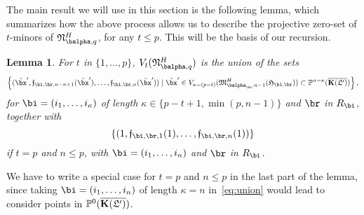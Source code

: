 \documentclass[12pt]{article}
\newtheorem{lemma}[definition]{Lemma}
\begin{document}
The main result we will use in this section is the following lemma,
which summarizes how the above process allows us to describe the
projective zero-set of $t$-minors of $\mathfrak{N}^H_{\balpha,q}$, for
any $t \le p$. This will be the basis of our recursion.
\begin{lemma}\label{lemma:union}
  For $t$ in $\{1,\dots,p\}$, $V_t(\mathfrak{N}^H_{\balpha,q})$ is the
  union of the sets
 \begin{align}\label{eq:union}
 \left \{(\tilde\bx',\mathfrak{f}_{\bi,\br,n-\kappa+1}(\tilde\bx'),\dots,\mathfrak{f}_{\bi,\br,n}(\tilde\bx')) \mid \tilde\bx' \in
  V_{\kappa-(p-t)}(\mathfrak{M}^H_{\balpha_\bi,n-1}(\mathfrak{H}_{\bi,\br})) \subset \P^{n-\kappa}(\KKGpbar)\right \},   
 \end{align}
 for $\bi=(i_1,\dots,i_\kappa)$ of length $\kappa \in \{p-t+1,\min(p,n-1)\}$ and $\br$ in $R_\bi$, together with
 $$\left \{
 (1,\mathfrak{f}_{\bi,\br,1}(1),\dots,\mathfrak{f}_{\bi,\br,n}(1))\right
 \}$$ if $t=p$ and $n \le p$, with $\bi=(i_1,\dots,i_n)$ and $\br$ in $R_\bi$.
\end{lemma}
\noindent We have to write a special case for $t=p$ and $n \le p$ in the last part of the lemma,
since taking $\bi=(i_1,\dots,i_n)$ of length $\kappa=n$
in~\eqref{eq:union} would lead to consider points in $\mathbb{P}^0(\overline{\mathbf{K}(\mathfrak{L}')})$.
\end{document}
